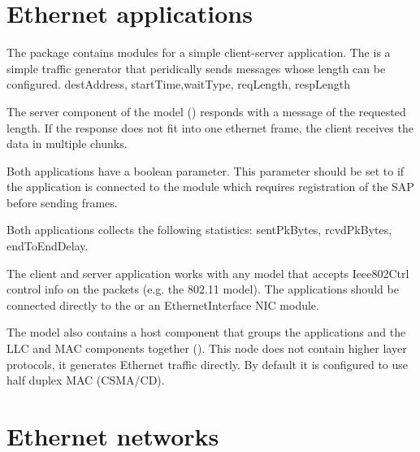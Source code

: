 
\section{Ethernet applications}

The  package contains modules
for a simple client-server application. The  is a simple
traffic generator that peridically sends  messages
whose length can be configured. destAddress, startTime,waitType, reqLength, respLength

The server component of the model () responds with a
 message of the requested length. If the response does
not fit into one ethernet frame, the client receives the data in multiple
chunks.


Both applications have a  boolean parameter.
This parameter should be set to  if the application is connected
to the  module which requires registration of the SAP
before sending frames.

Both applications collects the following statistics: sentPkBytes, rcvdPkBytes,
endToEndDelay.

The client and server application works with any model that accepts
Ieee802Ctrl control info on the packets (e.g. the 802.11 model).
The applications should be connected directly to the 
or an EthernetInterface NIC module.

The model also contains a host component that groups the applications
and the LLC and MAC components together (). This node does
not contain higher layer protocols, it generates Ethernet traffic directly.
By default it is configured to use half duplex MAC (CSMA/CD).

\section{Ethernet networks}

